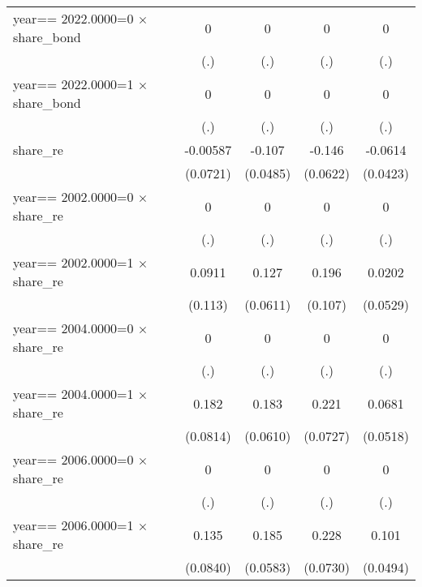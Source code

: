 \begin{table}[htbp]
\begin{tabular}{l*{4}{c}}
year==  2022.0000=0 $\times$ share\_bond&        0         &        0         &        0         &        0         \\
                &      (.)         &      (.)         &      (.)         &      (.)         \\
year==  2022.0000=1 $\times$ share\_bond&        0         &        0         &        0         &        0         \\
                &      (.)         &      (.)         &      (.)         &      (.)         \\
share\_re        & -0.00587         &   -0.107\sym{**} &   -0.146\sym{**} &  -0.0614         \\
                & (0.0721)         & (0.0485)         & (0.0622)         & (0.0423)         \\
year==  2002.0000=0 $\times$ share\_re&        0         &        0         &        0         &        0         \\
                &      (.)         &      (.)         &      (.)         &      (.)         \\
year==  2002.0000=1 $\times$ share\_re&   0.0911         &    0.127\sym{**} &    0.196\sym{*}  &   0.0202         \\
                &  (0.113)         & (0.0611)         &  (0.107)         & (0.0529)         \\
year==  2004.0000=0 $\times$ share\_re&        0         &        0         &        0         &        0         \\
                &      (.)         &      (.)         &      (.)         &      (.)         \\
year==  2004.0000=1 $\times$ share\_re&    0.182\sym{**} &    0.183\sym{***}&    0.221\sym{***}&   0.0681         \\
                & (0.0814)         & (0.0610)         & (0.0727)         & (0.0518)         \\
year==  2006.0000=0 $\times$ share\_re&        0         &        0         &        0         &        0         \\
                &      (.)         &      (.)         &      (.)         &      (.)         \\
year==  2006.0000=1 $\times$ share\_re&    0.135         &    0.185\sym{***}&    0.228\sym{***}&    0.101\sym{**} \\
                & (0.0840)         & (0.0583)         & (0.0730)         & (0.0494)         \\

\end{tabular}
\end{table}
